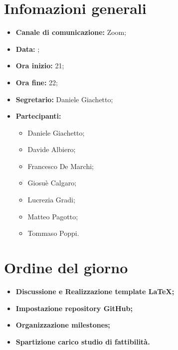 \section{Infomazioni generali}

\begin{itemize}

	\item \textbf{Canale di comunicazione:} Zoom;
	
	\item \textbf{Data:} \DataMeeting{};
	
	\item \textbf{Ora inizio:} 21;
	
	\item \textbf{Ora fine:} 22;
	
	\item \textbf{Segretario:} Daniele Giachetto;
	
	\item \textbf{Partecipanti:}
	
		\begin{itemize}
		
			\item Daniele Giachetto;
			\item Davide Albiero;
			\item Francesco De Marchi;
			\item Giosuè Calgaro;
			\item Lucrezia Gradi;
			\item Matteo Pagotto;
			\item Tommaso Poppi.
				 
		\end{itemize}

\end{itemize}

\section{Ordine del giorno}

\begin{itemize}

	\item\textbf{Discussione e Realizzazione template \LaTeX;}

	\item\textbf{Impostazione repository GitHub;}

	\item\textbf{Organizzazione milestones;}

	\item\textbf{Spartizione carico studio di fattibilità.}

\end{itemize}

